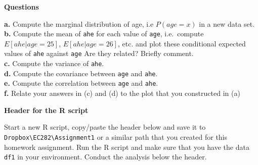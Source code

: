 \documentclass[
]{book}
\begin{document}
\textbf{Questions}

\textbf{a.} Compute the marginal distribution of age, i.e \(P(age=x)\) in a new data set.
\textbf{b.} Compute the mean of \texttt{ahe} for each value of \texttt{age}, i.e.~compute \(E[ahe|age=25]\),
\(E[ahe|age=26]\), etc. and plot these conditional expected values of \texttt{ahe} against \texttt{age} Are they related? Briefly comment.\\
\textbf{c.} Compute the variance of \texttt{ahe}.\\
\textbf{d.} Compute the covariance between \texttt{age} and \texttt{ahe}.\\
\textbf{e.} Compute the correlation between \texttt{age} and \texttt{ahe}.\\
\textbf{f.} Relate your answers in (c) and (d) to the plot that you constructed in (a)

\textbf{Header for the R script}

Start a new R script, copy/paste the header below and save it to \texttt{Dropbox\textbackslash{}EC282\textbackslash{}Assignment1} or a similar path that you created for this homework assignment. Run the R script and make sure that you have the data \texttt{df1} in your environment. Conduct the analysis below the header.
\end{document}
